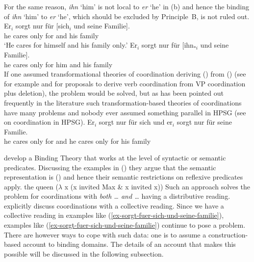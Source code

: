 \documentclass[output=paper
 	        ,biblatex
                ,babelshorthands
                ,newtxmath
                ,draftmode
                ,colorlinks, citecolor=brown
]{langscibook}
\begin{document}
For the same reason, \emph{ihn} `him' is not local to \emph{er} `he' in (b) and hence the
binding of \emph{ihn} `him' to \emph{er} `he', which should be excluded by Principle~B, is not ruled out.
\eal
\label{ex-sorgt-fuer-sich-und-seine-familie}
\ex
\gll Er$_{i}$ sorgt nur für [sich$_{i}$ und seine Familie].\\
     he      cares only for \spacebr{}\self{} and his family\\
\glt `He cares for himself and his family only.'
\ex 
\gll Er$_{i}$ sorgt nur für [ihn$_{*i}$ und seine Familie].\\
     he      cares only for \spacebr{}him and his family\\
\zl
If one assumed transformational theories of coordination deriving () from () (see for example
\citealp[]{WC80a-u} and \citealp[, 67]{Kayne94a-u} for proposals to derive verb
coordination from VP coordination plus deletion), the problem would be solved, but as has been
pointed out frequently in the literature such transformation-based theories of coordinations have
many problems \parencites[]{BV72}[--193]{Jackendoff77a}[]{Dowty79a}[--105]{denBesten83a}{Klein85}{Eisenberg94a}[]{Borsley2005a} and nobody ever assumed
something parallel in HPSG (see  on coordination in HPSG).
\ea
\gll Er$_{i}$ sorgt nur für sich     und er$_{i}$ sorgt nur für seine Familie.\\
     he      cares only for \self{} and he       cares only for his family\\
\z

\citet{RR93a} develop a Binding Theory that works at the level of syntactic or semantic
predicates. Discussing the examples in () they argue that the semantic representation is
() and hence their semantic restrictions on reflexive predicates apply.
\eal
{}
\zl
\ea
the queen ($\lambda$ x (x invited Max \& x invited x))
\z
Such an approach solves the problem for coordinations with \emph{both \ldots{} and \ldots} having a
distributive reading. \citet[]{RR93a} explicitly discuss coordinations with a collective
reading. Since we have a collective reading in examples like
(\ref{ex-sorgt-fuer-sich-und-seine-familie}), examples like (\ref{ex-sorgt-fuer-sich-und-seine-familie}) continue to pose a problem. There are
however ways to cope with such data: one is to assume a construction-based account to binding
domains. The details of an account that makes this possible will be discussed in the following subsection.
\end{document}
